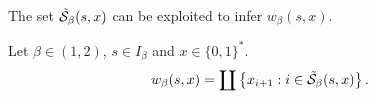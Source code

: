 The set $\tilde {\mathcal{S}}_\beta(s,x)$ can be exploited to infer $w_\beta(s,x)$.
\begin{lemma}\label{lem:the noise can be expressed from the time steps for which the trajectory is in switch set}
    Let $\beta \in (1,2)$, $s \in I_\beta$ and $x \in \{0,1\}^\ast$. 
    \begin{equation}
        w_\beta(s,x) = \coprod \left\{ x_{i+1} : i \in \tilde {\mathcal{S}}_\beta(s,x)\right\}.
    \end{equation}
\end{lemma}


